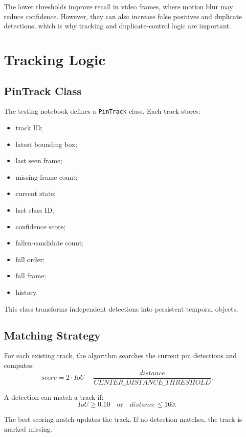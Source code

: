 \documentclass[12pt,a4paper]{article}
\begin{document}
The lower thresholds improve recall in video frames, where motion blur may reduce confidence. However, they can also increase false positives and duplicate detections, which is why tracking and duplicate-control logic are important.

\section{Tracking Logic}

\subsection{PinTrack Class}

The testing notebook defines a \texttt{PinTrack} class. Each track stores:
\begin{itemize}[noitemsep]
    \item track ID;
    \item latest bounding box;
    \item last seen frame;
    \item missing-frame count;
    \item current state;
    \item last class ID;
    \item confidence score;
    \item fallen-candidate count;
    \item fall order;
    \item fall frame;
    \item history.
\end{itemize}

This class transforms independent detections into persistent temporal objects.

\subsection{Matching Strategy}

For each existing track, the algorithm searches the current pin detections and computes:
\[
score = 2\cdot IoU - \frac{distance}{CENTER\_DISTANCE\_THRESHOLD}.
\]

A detection can match a track if:
\[
IoU \geq 0.10
\quad \text{or} \quad
distance \leq 160.
\]

The best scoring match updates the track. If no detection matches, the track is marked missing.
\end{document}
